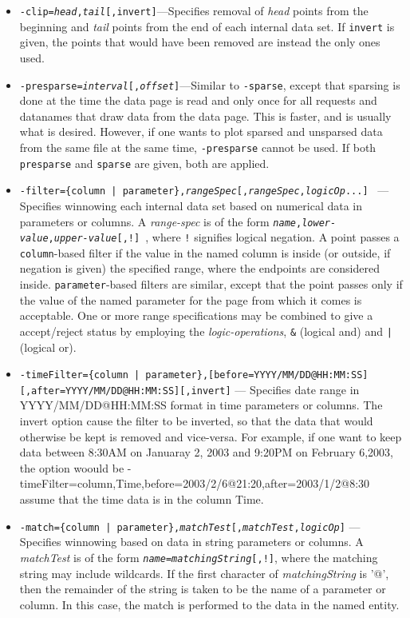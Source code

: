 \begin{itemize}
\begin{itemize}
\begin{itemize}
  \item {\tt -clip={\em head},{\em tail}[,invert]}---Specifies removal of {\em head} points from the
beginning and {\em tail} points from the end of each internal data set.  If {\tt invert} is given,
the points that would have been removed are instead the only ones used.

  \item {\tt -presparse={\em interval}[,{\em offset}]}---Similar to {\tt -sparse}, except that
sparsing is done at the time the data page is read and only once for all requests and
datanames that draw data from the data page.  This is faster, and is usually what is desired.
However, if one wants to plot sparsed and unsparsed data from the same file at the same time,
{\tt -presparse} cannot be used.  If both {\tt presparse} and {\tt sparse} are given, both
are applied.

   \item {\tt -filter=\{column | parameter\},{\em rangeSpec}[,{\em rangeSpec},{\em logicOp}...] }
--- Specifies winnowing each internal data set based on numerical data in parameters or columns.  A
{\em range-spec} is of the form {\tt {\em name},{\em lower-value},{\em upper-value}[,!] }, where
\verb|!| signifies logical negation.  A point passes a {\tt column}-based filter if the value in the
named column is inside (or outside, if negation is given) the specified range, where the endpoints
are considered inside.  {\tt parameter}-based filters are similar, except that the point passes only
if the value of the named parameter for the page from which it comes is acceptable.  One or more
range specifications may be combined to give a accept/reject status by employing the {\em
logic-operations}, \verb|&| (logical and) and \verb&|& (logical or).
     \item {\tt -timeFilter=\{column | parameter\},[before=YYYY/MM/DD@HH:MM:SS] [,after=YYYY/MM/DD@HH:MM:SS][,invert]} 
--- Specifies date range in YYYY/MM/DD@HH:MM:SS format in time parameters or columns. The invert option cause the
filter to be inverted, so that the data that would otherwise be kept is removed and vice-versa. For example,
if one want to keep data between 8:30AM on Januaray 2, 2003 and 9:20PM on February 6,2003, the option woould be
     -timeFilter=column,Time,before=2003/2/6@21:20,after=2003/1/2@8:30
assume that the time data is in the column Time.
   \item {\tt -match=\{column | parameter\},{\em matchTest}[,{\em matchTest},{\em logicOp}]} ---
Specifies winnowing based on data in string parameters or columns.  A {\em matchTest} is of the form
{\tt {\em name}={\em matchingString}[,!]}, where the matching string may include wildcards.
If the first character of {\em matchingString} is '@', then the remainder of the string is taken to
be the name of a parameter or column.  In this case, the match is performed to the data in the named
entity.


\end{itemize}
\end{itemize}
\end{itemize}
